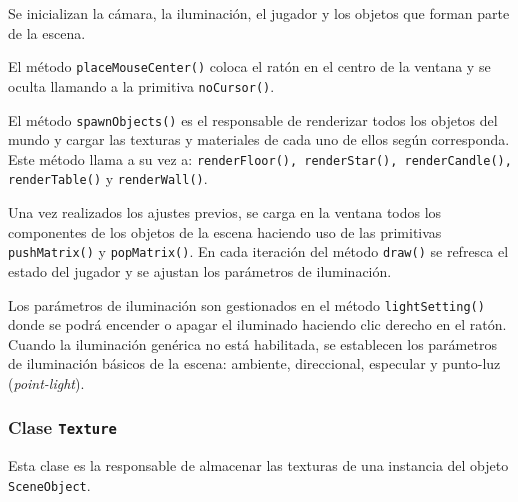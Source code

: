 \documentclass[10pt,a4paper]{report}
\begin{document}
	
	
	Se inicializan la cámara, la iluminación, el jugador y los objetos que forman parte de la escena. 
	
	
	
	El método \texttt{placeMouseCenter()} coloca el ratón en el centro de la ventana y se oculta llamando a la primitiva \texttt{noCursor()}.
	
	
	
	El método \texttt{spawnObjects()} es el responsable de renderizar todos los objetos del mundo y cargar las texturas y materiales de cada uno de ellos según corresponda. Este método llama a su vez a: \texttt{renderFloor(), renderStar(), renderCandle(), renderTable()} y \texttt{renderWall()}.
	
	
	
	Una vez realizados los ajustes previos, se carga en la ventana todos los componentes de los objetos de la escena haciendo uso de las primitivas \texttt{pushMatrix()} y \texttt{popMatrix()}. En cada iteración del método \texttt{draw()} se refresca el estado del jugador y se ajustan los parámetros de iluminación.
	
	 
	
	Los parámetros de iluminación son gestionados en el método \texttt{lightSetting()} donde se podrá encender o apagar el iluminado haciendo clic derecho en el ratón. Cuando la iluminación genérica no está habilitada, se establecen los parámetros de iluminación básicos de la escena: ambiente, direccional, especular y punto-luz (\textit{point-light}).
	
	 
	
	
	\subsubsection{Clase \texttt{Texture}}
	Esta clase es la responsable de almacenar las texturas de una instancia del objeto \texttt{SceneObject}.
	
	
	
\end{document}
